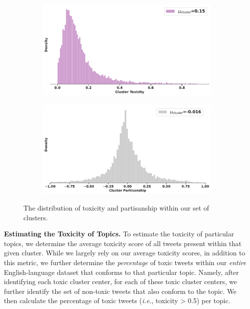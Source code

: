 \begin{figure}
\begin{subfigure}[l]{0.45\textwidth}
\includegraphics[width=1\columnwidth]{figures/cluster_toxicity_dist3.pdf}
\caption{}
\label{fig:cluster-dists-toxic}
\end{subfigure}
\begin{subfigure}[l]{0.45\textwidth}
\includegraphics[width=1\columnwidth]{figures/cluster_partisanship_dist3.pdf} 
\caption{}
\label{fig:cluster-dists-part}
\end{subfigure}
\caption{The distribution of toxicity and partisanship within our set of clusters.}
\end{figure}

\vspace{2pt}\noindent
\noindent
\textbf{Estimating the Toxicity of Topics.}
To estimate the toxicity of particular topics, we determine the average toxicity score of all tweets present within that given cluster. While we largely rely on our average toxicity scores, in addition to this metric, we further determine the \emph{percentage} of toxic tweets within our \emph{entire} English-language dataset that conforms to that particular topic.  Namely, after identifying each toxic cluster center, for each of these toxic cluster centers, we further identify the set of non-toxic tweets that also conform to the topic. We then calculate the percentage of toxic tweets (\textit{i.e.}, toxicity > 0.5) per topic. 

